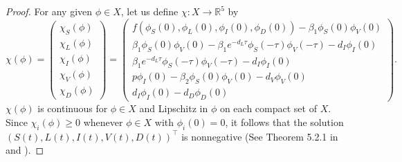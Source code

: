 \documentclass{CMHPhD-SIVD}
\begin{document}
\begin{proof} For any given $\phi\in X$, let us define
	$\chi:X\to\mathbb{R}^5$ by
\begin{equation}\label{38}
     \chi(\phi)=
     \begin{pmatrix}
			 \chi_S(\phi) \\ \chi_L(\phi) \\ \chi_I(\phi) \\ \chi_V(\phi) \\ \chi_D(\phi)
		 \end{pmatrix}=
     \begin{pmatrix}
     f(\phi_S(0), \phi_L(0), \phi_I(0), \phi_D(0))-\beta_1 \phi_S(0)\phi_V(0)\\
      \beta_1 \phi_S(0)\phi_V(0) - \beta_1 e^{-d_L \tau} \phi_S(-\tau) \phi_V(-\tau) -d_I \phi_I(0)  \\
      \beta_1 e^{-d_L \tau} \phi_S(-\tau) \phi_V(-\tau) -d_I \phi_I(0)  \\
     p\phi_I(0)-\beta_2 \phi_S(0) \phi_V(0)-d_V \phi_V(0)\\
     d_I \phi_I(0)-d_D \phi_D(0)
     \end{pmatrix}.
\end{equation}
	$\chi(\phi)$ is continuous for $\phi\in X$ and Lipschitz in $\phi$ on each compact set of $X$. Since $\chi_i(\phi)\geq0$ whenever $\phi \in X$ with $\phi_i(0) = 0$, it follows that the solution $(S(t), L(t), I(t),V(t),D(t))^\top$ is nonnegative (See Theorem 5.2.1 in \cite{smith1995monotone} and \cite{guo2018global}).









\end{proof}
\end{document}
